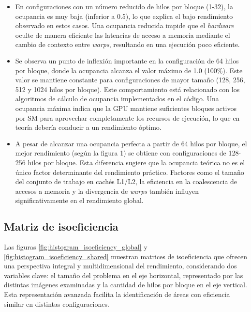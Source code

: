         \begin{itemize}
        
            \item En configuraciones con un número reducido de hilos por bloque (1-32), la ocupancia es muy baja (inferior a 0.5), lo que explica el bajo rendimiento observado en estos casos. Una ocupancia reducida impide que el \textit{hardware} oculte de manera eficiente las latencias de acceso a memoria mediante el cambio de contexto entre \textit{warps}, resultando en una ejecución poco eficiente.
            
            \item Se observa un punto de inflexión importante en la configuración de 64 hilos por bloque, donde la ocupancia alcanza el valor máximo de 1.0 (100\%). Este valor se mantiene constante para configuraciones de mayor tamaño (128, 256, 512 y 1024 hilos por bloque). Este comportamiento está relacionado con los algoritmos de cálculo de ocupancia implementados en el código. Una ocupancia máxima indica que la GPU mantiene suficientes bloques activos por SM para aprovechar completamente los recursos de ejecución, lo que en teoría debería conducir a un rendimiento óptimo.
            
            \item A pesar de alcanzar una ocupancia perfecta a partir de 64 hilos por bloque, el mejor rendimiento (según la figura 1) se obtiene con configuraciones de 128-256 hilos por bloque. Esta diferencia sugiere que la ocupancia teórica no es el único factor determinante del rendimiento práctico. Factores como el tamaño del conjunto de trabajo en cachés L1/L2, la eficiencia en la coalescencia de accesos a memoria y la divergencia de \textit{warps} también influyen significativamente en el rendimiento global.
            
        \end{itemize}
        
    \subsection{Matriz de isoeficiencia}

        Las figuras \ref{fig:histogram_isoeficiency_global} y \ref{fig:histogram_isoeficiency_shared} muestran matrices de isoeficiencia que ofrecen una perspectiva integral y multidimensional del rendimiento, considerando dos variables clave: el tamaño del problema en el eje horizontal, representado por las distintas imágenes examinadas y la cantidad de hilos por bloque en el eje vertical. Esta representación avanzada facilita la identificación de áreas con eficiencia similar en distintas configuraciones.


